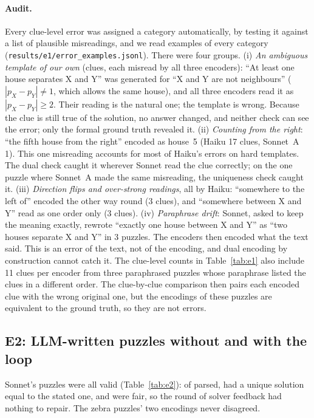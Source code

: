 \paragraph{Audit.}\label{sec:audit} Every clue-level error was assigned a category automatically, by testing it against a list of plausible misreadings, and we read examples of every category (\texttt{results/e1/error\_examples.jsonl}). There were four groups.
(i) \emph{An ambiguous template of our own} (\EOneTaxTooStrong clues, each misread by all three encoders): ``At least one house separates X and Y'' was generated for ``X and Y are not neighbours'' ($|p_X-p_Y|\neq1$, which allows the same house), and all three encoders read it as $|p_X-p_Y|\ge2$. Their reading is the natural one; the template is wrong. Because the clue is still true of the solution, no answer changed, and neither check can see the error; only the formal ground truth revealed it.
(ii) \emph{Counting from the right}: ``the fifth house from the right'' encoded as house~5 (Haiku 17 clues, Sonnet~A 1). This one misreading accounts for most of Haiku's errors on hard templates. The dual check caught it wherever Sonnet read the clue correctly; on the one puzzle where Sonnet~A made the same misreading, the uniqueness check caught it.
(iii) \emph{Direction flips and over-strong readings}, all by Haiku: ``somewhere to the left of'' encoded the other way round (3 clues), and ``somewhere between X and Y'' read as one order only (3 clues).
(iv) \emph{Paraphrase drift}: Sonnet, asked to keep the meaning exactly, rewrote ``exactly one house between X and Y'' as ``two houses separate X and Y'' in 3 puzzles. The encoders then encoded what the text said. This is an error of the text, not of the encoding, and dual encoding by construction cannot catch it.
The clue-level counts in Table~\ref{tab:e1} also include 11 clues per encoder from three paraphrased puzzles whose paraphrase listed the clues in a different order. The clue-by-clue comparison then pairs each encoded clue with the wrong original one, but the encodings of these puzzles are equivalent to the ground truth, so they are not errors.

\subsection{E2: LLM-written puzzles without and with the loop}

Sonnet's puzzles were all valid (Table~\ref{tab:e2}): \ETwoValid of \ETwoN parsed, had a unique solution equal to the stated one, and were fair, so the round of solver feedback had nothing to repair. The zebra puzzles' two encodings never disagreed.


